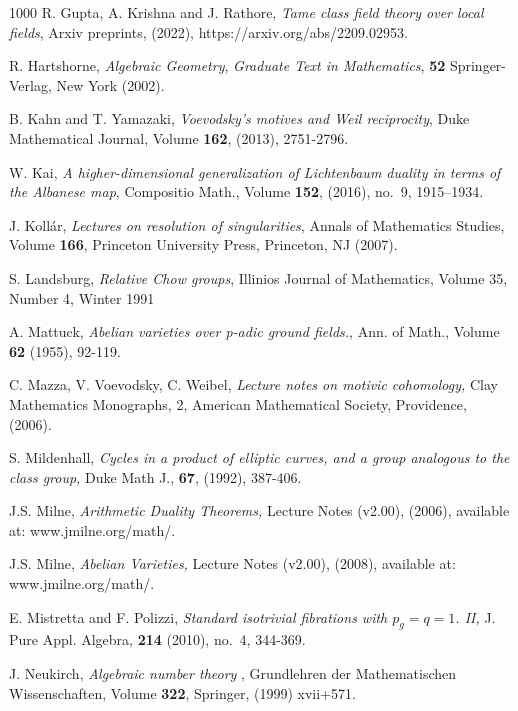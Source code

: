 \documentclass[12pt]{amsart}
\theoremstyle{remark}
\renewcommand{\1}{{\mathbb{S}}}
\newcommand{\<}{\langle}
\renewcommand{\>}{\rangle}
\begin{document}
\begin{thebibliography}{1000}
         R. Gupta, A. Krishna and J. Rathore, {\sl Tame class field theory over local fields}, Arxiv preprints, (2022), https://arxiv.org/abs/2209.02953. \ 

        	
		  R. Hartshorne, \textit{Algebraic Geometry}, \textit{Graduate Text in Mathematics}, \textbf{52} Springer-Verlag, New York (2002). \ 
		
		
		 B. Kahn and T. Yamazaki,  {\sl Voevodsky's motives and Weil reciprocity}, Duke Mathematical Journal, Volume {\bf 162}, (2013), 2751-2796. \ 

         W. Kai,  {\sl A higher-dimensional generalization of Lichtenbaum duality in terms of the Albanese map}, Compositio Math., Volume {\bf 152}, (2016), no.~9, 1915--1934. \ 

         J. Koll\'ar,  {\sl Lectures on resolution of singularities}, Annals of Mathematics Studies, Volume {\bf 166}, Princeton University Press, Princeton, NJ (2007). \ 


         S. Landsburg, {\sl Relative Chow groups}, Illinios Journal of Mathematics, Volume 35, Number 4, Winter 1991
		
			  A. Mattuck,  {\sl Abelian varieties over p-adic ground fields.\/},  Ann. of Math., Volume {\bf 62} (1955), 92-119. \

     C. Mazza, V. Voevodsky, C. Weibel, 
{\sl Lecture notes on motivic cohomology,\/} Clay Mathematics
Monographs, 2, American Mathematical Society, Providence, (2006).\

 S. Mildenhall,  
{\sl Cycles in a product of elliptic curves, and a group analogous to the class group,\/} Duke Math J., \textbf{67}, (1992), 387-406.\

 J.S. Milne,  
{\sl Arithmetic Duality Theorems,\/} Lecture Notes (v2.00), (2006), available at: www.jmilne.org/math/.\

 J.S. Milne,  
{\sl Abelian Varieties,\/} Lecture Notes (v2.00), (2008), available at: www.jmilne.org/math/.\


           E. Mistretta and F. Polizzi,  
{\sl Standard isotrivial fibrations with $p_g=q=1$. II,\/} J. Pure Appl. Algebra, \textbf{214} (2010), no.~4, 344-369.\  

        		J. Neukirch, {\sl Algebraic number theory \/}, Grundlehren der Mathematischen Wissenschaften, Volume {\bf 322}, Springer, (1999) xvii+571. \


\end{thebibliography}
\end{document}
